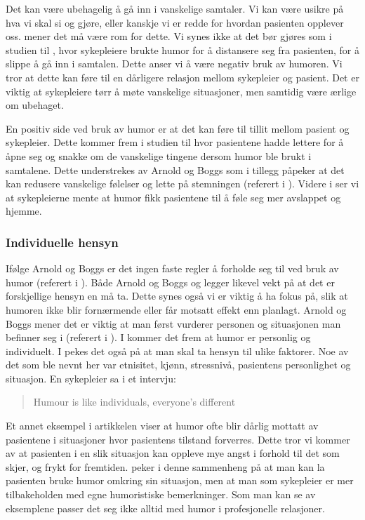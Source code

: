 Det kan være ubehagelig å gå inn i vanskelige samtaler. Vi kan være usikre på
hva vi skal si og gjøre, eller kanskje vi er redde for hvordan pasienten
opplever oss.  mener det må være rom for dette.
Vi synes ikke at det bør gjøres som i studien til , hvor
sykepleiere brukte humor for å distansere seg fra pasienten, for å slippe å gå
inn i samtalen.  Dette anser vi å være negativ bruk av humoren. Vi tror at
dette kan føre til en dårligere relasjon mellom sykepleier og pasient. Det er
viktig at sykepleiere tørr å møte vanskelige situasjoner, men samtidig være
ærlige om ubehaget.

En positiv side ved bruk av humor er at det kan føre til tillit mellom pasient
og sykepleier. Dette kommer frem i studien til  hvor
pasientene hadde lettere for å åpne seg og snakke om de vanskelige tingene
dersom humor ble brukt i samtalene. Dette understrekes av Arnold og Boggs som
i tillegg påpeker at det kan redusere vanskelige følelser og lette på
stemningen (referert i ). Videre i  ser vi at
sykepleierne mente at humor fikk pasientene til å føle seg mer avslappet og
hjemme.

\subsubsection{Individuelle hensyn}

Ifølge Arnold og Boggs er det ingen faste regler å forholde seg til ved bruk
av humor (referert i ). Både Arnold og Boggs og
 legger likevel vekt på at det er forskjellige hensyn en må
ta. Dette synes også vi er viktig å ha fokus på, slik at humoren ikke blir
fornærmende eller får motsatt effekt enn planlagt. Arnold og Boggs mener det
er viktig at man først vurderer personen og situasjonen man befinner seg i
(referert i ). I  kommer det frem at humor er
personlig og individuelt. I  pekes det også på at man skal ta
hensyn til ulike faktorer. Noe av det som ble nevnt her var etnisitet, kjønn,
stressnivå, pasientens personlighet og situasjon. En sykepleier sa i et
intervju: \blockquote[{}]{Humour is like individuals,
everyone's different}. Et annet eksempel i artikkelen viser at humor ofte blir
dårlig mottatt av pasientene i situasjoner hvor pasientens tilstand forverres.
Dette tror vi kommer av at pasienten i en slik situasjon kan oppleve mye angst
i forhold til det som skjer, og frykt for fremtiden.  peker i
denne sammenheng på at man kan la pasienten bruke humor omkring sin situasjon,
men at man som sykepleier er mer tilbakeholden med egne humoristiske
bemerkninger. Som man kan se av eksemplene passer det seg ikke alltid med humor
i profesjonelle relasjoner.

